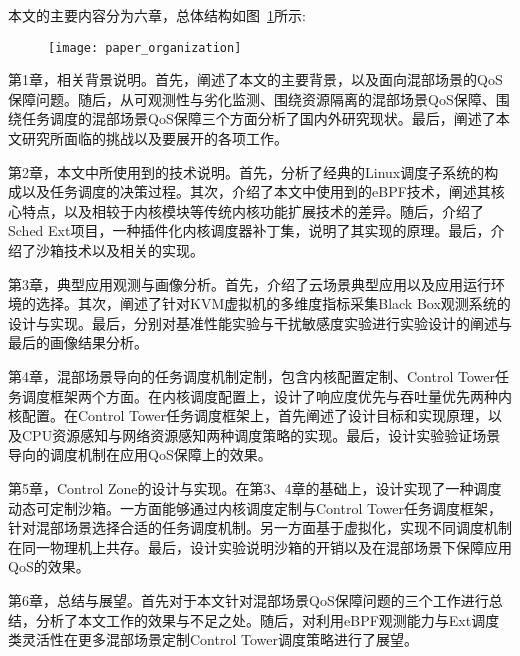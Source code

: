 本文的主要内容分为六章，总体结构如图~\ref{fig:paper_organization}所示:

\begin{figure}[!htbp]
    \centering
    \texttt{[image: paper\_organization]}
    \label{fig:paper_organization}
\end{figure}

第1章，相关背景说明。首先，阐述了本文的主要背景，以及面向混部场景的QoS保障问题。随后，从可观测性与劣化监测、围绕资源隔离的混部场景QoS保障、围绕任务调度的混部场景QoS保障三个方面分析了国内外研究现状。最后，阐述了本文研究所面临的挑战以及要展开的各项工作。

第2章，本文中所使用到的技术说明。首先，分析了经典的Linux调度子系统的构成以及任务调度的决策过程。其次，介绍了本文中使用到的eBPF技术，阐述其核心特点，以及相较于内核模块等传统内核功能扩展技术的差异。随后，介绍了Sched Ext项目，一种插件化内核调度器补丁集，说明了其实现的原理。最后，介绍了沙箱技术以及相关的实现。

第3章，典型应用观测与画像分析。首先，介绍了云场景典型应用以及应用运行环境的选择。其次，阐述了针对KVM虚拟机的多维度指标采集Black Box观测系统的设计与实现。最后，分别对基准性能实验与干扰敏感度实验进行实验设计的阐述与最后的画像结果分析。

第4章，混部场景导向的任务调度机制定制，包含内核配置定制、Control Tower任务调度框架两个方面。在内核调度配置上，设计了响应度优先与吞吐量优先两种内核配置。在Control Tower任务调度框架上，首先阐述了设计目标和实现原理，以及CPU资源感知与网络资源感知两种调度策略的实现。最后，设计实验验证场景导向的调度机制在应用QoS保障上的效果。

第5章，Control Zone的设计与实现。在第3、4章的基础上，设计实现了一种调度动态可定制沙箱。一方面能够通过内核调度定制与Control Tower任务调度框架，针对混部场景选择合适的任务调度机制。另一方面基于虚拟化，实现不同调度机制在同一物理机上共存。最后，设计实验说明沙箱的开销以及在混部场景下保障应用QoS的效果。

第6章，总结与展望。首先对于本文针对混部场景QoS保障问题的三个工作进行总结，分析了本文工作的效果与不足之处。随后，对利用eBPF观测能力与Ext调度类灵活性在更多混部场景定制Control Tower调度策略进行了展望。